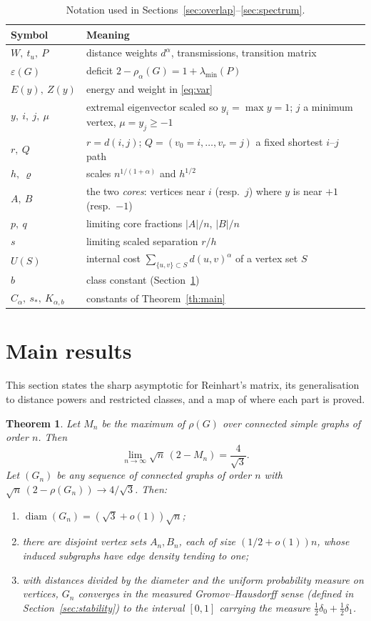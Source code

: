 \documentclass[11pt,a4paper]{article}
\newtheorem{theorem}{Theorem}
\theoremstyle{definition}
\newcommand{\eps}{\varepsilon}
\newcommand{\diam}{\operatorname{diam}}
\begin{document}
\begin{table}[ht]
\centering\small
\begin{tabular}{ll}
\toprule
Symbol & Meaning\\\midrule
$W,\ t_u,\ P$ & distance weights $d^\alpha$, transmissions, transition matrix\\
$\eps(G)$ & deficit $2-\rho_\alpha(G)=1+\lambda_{\min}(P)$\\
$E(y),\ Z(y)$ & energy and weight in \eqref{eq:var}\\
$y,\ i,\ j,\ \mu$ & extremal eigenvector scaled so $y_i=\max y=1$; $j$ a minimum vertex, $\mu=y_j\ge-1$\\
$r,\ Q$ & $r=d(i,j)$; $Q=(v_0=i,\dots,v_r=j)$ a fixed shortest $i$--$j$ path\\
$h,\ \varrho$ & scales $n^{1/(1+\alpha)}$ and $h^{1/2}$\\
$A,\ B$ & the two \emph{cores}: vertices near $i$ (resp.\ $j$) where $y$ is near $+1$ (resp.\ $-1$)\\
$p,\ q$ & limiting core fractions $|A|/n$, $|B|/n$\\
$s$ & limiting scaled separation $r/h$\\
$U(S)$ & internal cost $\sum_{\{u,v\}\subset S}d(u,v)^\alpha$ of a vertex set $S$\\
$b$ & class constant (Section~\ref{sec:results})\\
$C_\alpha,\ s_*,\ K_{\alpha,b}$ & constants of Theorem~\ref{th:main}\\
\bottomrule
\end{tabular}
\caption{Notation used in Sections~\ref{sec:overlap}--\ref{sec:spectrum}.}\label{tab:notation}
\end{table}

\section{Main results}\label{sec:results}
This section states the sharp asymptotic for Reinhart's matrix, its generalisation to distance powers and restricted classes, and a map of where each part is proved.

\begin{theorem}\label{th:specific}
Let $M_n$ be the maximum of $\rho(G)$ over connected simple graphs of order $n$. Then
\[
 \lim_{n\to\infty}\sqrt n\,(2-M_n)=\frac4{\sqrt3}.
\]
Let $(G_n)$ be any sequence of connected graphs of order $n$ with $\sqrt n\,(2-\rho(G_n))\to4/\sqrt3$. Then:
\begin{enumerate}
\item[(a)] $\diam(G_n)=(\sqrt3+o(1))\sqrt n$;
\item[(b)] there are disjoint vertex sets $A_n,B_n$, each of size $(1/2+o(1))n$, whose induced subgraphs have edge density tending to one;
\item[(c)] with distances divided by the diameter and the uniform probability measure on vertices, $G_n$ converges in the measured Gromov--Hausdorff sense (defined in Section~\ref{sec:stability}) to the interval $[0,1]$ carrying the measure $\frac12\delta_0+\frac12\delta_1$.
\end{enumerate}
\end{theorem}
\end{document}
